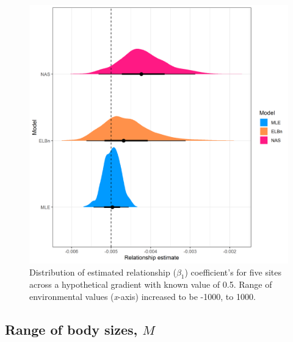\documentclass[
]{article}
\begin{document}
\newpage

\begin{figure}
\centering
\includegraphics{figures/PLB_large_x_relationship_density.png}
\caption{Distribution of estimated relationship (\(\beta_1\))
coefficient's for five sites across a hypothetical gradient with known
value of 0.5. Range of environmental values (\emph{x}-axis) increased to
be -1000, to 1000.}
\end{figure}

\newpage

\hypertarget{range-of-body-sizes-m}{%
\subsection{\texorpdfstring{Range of body sizes,
\(M\)}{Range of body sizes, M}}\label{range-of-body-sizes-m}}
\end{document}
